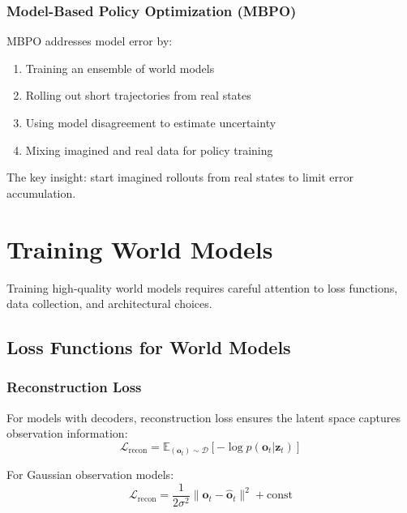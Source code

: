 \subsubsection{Model-Based Policy Optimization (MBPO)}

MBPO addresses model error by:
\begin{enumerate}
    \item Training an ensemble of world models
    \item Rolling out short trajectories from real states
    \item Using model disagreement to estimate uncertainty
    \item Mixing imagined and real data for policy training
\end{enumerate}

The key insight: start imagined rollouts from real states to limit error accumulation.

\section{Training World Models}
\label{sec:training_world_models}

Training high-quality world models requires careful attention to loss functions, data collection, and architectural choices.

\subsection{Loss Functions for World Models}

\subsubsection{Reconstruction Loss}

For models with decoders, reconstruction loss ensures the latent space captures observation information:
\begin{equation}
\mathcal{L}_{\text{recon}} = \mathbb{E}_{(\mathbf{o}_t) \sim \mathcal{D}} \left[ -\log p(\mathbf{o}_t | \mathbf{z}_t) \right]
\end{equation}

For Gaussian observation models:
\begin{equation}
\mathcal{L}_{\text{recon}} = \frac{1}{2\sigma^2} \| \mathbf{o}_t - \hat{\mathbf{o}}_t \|^2 + \text{const}
\end{equation}

